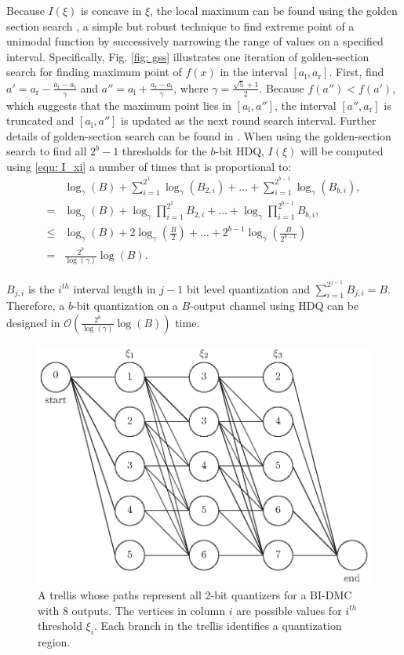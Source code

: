 \documentclass [PhD] {uclathes}
\begin{document}
Because $I(\xi)$ is concave in $\xi$, the local maximum can be found using the golden section search \cite{Kiefer1953-pc}, a simple but robust technique to find extreme point of a unimodal function by successively narrowing the range of values on a specified interval. Specifically, Fig. \ref{fig: gss} illustrates one iteration of golden-section search for finding maximum point of $f(x)$ in the interval $[a_\text{l},a_{\text{r}}]$. First, find $a'=a_{\text{r}}-\frac{a_\text{r}-a_\text{l}}{\gamma}$ and $a''=a_{\text{l}}+\frac{a_\text{r}-a_\text{l}}{\gamma}$, where $\gamma = \frac{\sqrt{5}+1}{2}$. Because $f(a'')<f(a')$, which suggests that the maximum point lies in $[a_\text{l},a'']$, the interval $[a'',a_\text{r}]$ is truncated and  $[a_\text{l},a'']$ is updated as the next round search interval. Further details of golden-section search can be found in \cite{Kiefer1953-pc}. When using the golden-section search to find all $2^b -1$ thresholds for the $b$-bit HDQ, $I(\xi)$ will be computed using \eqref{equ: I_xi} a number of times that is proportional to: 
\begin{align}
    &\log_{\gamma}(B)+\sum_{i=1}^{2^1}\log_{\gamma}(B_{2,i})+\ldots+\sum_{i=1}^{2^{b-1}}\log_{\gamma}(B_{b,i}),\\
   =&\log_{\gamma}(B)+\log_{\gamma}\prod_{i=1}^{2^1}B_{2,i}+\ldots+\log_{\gamma}\prod_{i=1}^{2^{b-1}}B_{b,i},\\
    \leq&\log_{\gamma}(B)+2\log_{\gamma}\left(\frac{B}{2}\right)+\ldots+2^{b-1}\log_{\gamma}\left(\frac{B}{2^{b-1}}\right)\\=& \frac{2^b}{\log(\gamma)}\log(B).
\end{align}

$B_{j,i}$ is the $i^{th}$ interval length in ${j-1}$ bit level quantization and $\sum_{i=1}^{2^{j-1}}B_{j,i}=B$. Therefore, a $b$-bit quantization on a  $B$-output channel using HDQ can be designed in $\mathcal{O}\left(\frac{2^b}{\log(\gamma)}\log(B)\right)$ time.
\begin{figure}[t]
	\centering
	\includegraphics[width=0.5\linewidth]{figures/trellis.eps}
	\caption{A trellis whose paths represent all 2-bit quantizers for a BI-DMC with 8 outputs. The vertices in column $i$ are possible values for $i^{th}$ threshold $\xi_i$. Each branch in the trellis identifies a quantization region.
	}
	\label{fig: trellis}
\end{figure}
\end{document}
